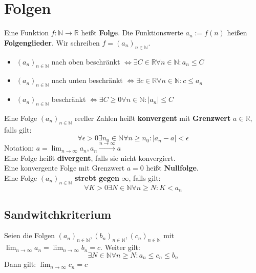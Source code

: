 \documentclass[12pt]{article}
\begin{document}
\section{Folgen}
Eine Funktion $f: \mathbb{N} \to \mathbb{R}$ heißt \textbf{Folge}. Die Funktionswerte $a_n := f(n)$ heißen \textbf{Folgenglieder}. Wir schreiben $f = (a_n)_{n\in\mathbb{N}}$.
\begin{itemize}
    \item $(a_n)_{n\in\mathbb{N}}$ nach oben beschränkt $\Longleftrightarrow \exists C \in \mathbb{R} \forall n \in \mathbb{N}: a_n \leq C$
    \item $(a_n)_{n\in\mathbb{N}}$ nach unten beschränkt $\Longleftrightarrow \exists c \in \mathbb{R} \forall n \in \mathbb{N}: c \leq a_n$
    \item $(a_n)_{n\in\mathbb{N}}$ beschränkt $\Longleftrightarrow \exists C \geq 0 \forall n \in \mathbb{N}: |a_n| \leq C$
\end{itemize}
Eine Folge $(a_n)_{n\in\mathbb{N}}$ reeller Zahlen heißt \textbf{konvergent} mit \textbf{Grenzwert} $a \in \mathbb{R}$, falls gilt:
\[\forall \epsilon > 0 \exists n_0 \in \mathbb{N} \forall n \geq n_0: |a_n - a| < \epsilon\]
Notation: $a = \lim_{n \to \infty} a_n, a_n \xrightarrow{n \to \infty} a$ \\
\newline
Eine Folge heißt \textbf{divergent}, falls sie nicht konvergiert. \\
Eine konvergente Folge mit Grenzwert $a = 0$ heißt \textbf{Nullfolge}. \\
\newline
Eine Folge $(a_n)_{n\in\mathbb{N}}$ \textbf{strebt gegen} $\infty$, falls gilt: 
\[\forall K > 0 \exists N \in \mathbb{N} \forall n \geq N : K < a_n\]
\subsection{Sandwitchkriterium}
Seien die Folgen $(a_n)_{n\in\mathbb{N}}, (b_n)_{n\in\mathbb{N}}, (c_n)_{n\in\mathbb{N}}$ mit $\lim_{n\to\infty}a_n = \lim_{n\to\infty}b_n = c$. Weiter gilt:
\[\exists N \in \mathbb{N} \forall n \geq N : a_n \leq c_n \leq b_n\]
Dann gilt: $\lim_{n\to\infty}c_n = c$
\end{document}

